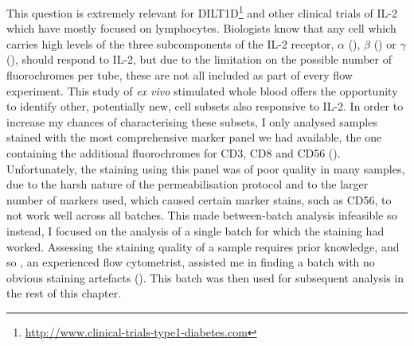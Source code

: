 This question is extremely relevant for DILT1D\footnote{\url{http://www.clinical-trials-type1-diabetes.com}} and other clinical trials of IL-2 which have mostly focused on lymphocytes.  %
Biologists know that any cell which carries high levels of the three subcomponents of the IL-2 receptor, $\alpha$ (), $\beta$ () or $\gamma$ (), should respond to IL-2, but due
to the limitation on the possible number of fluorochromes per tube, these are not all included as part of every flow experiment.  
This study of \emph{ex vivo} stimulated whole blood offers the opportunity to identify other, potentially new, cell subsets also responsive to IL-2.
In order to increase my chances of characterising these subsets, I only analysed samples stained with the most comprehensive marker panel we had available, the one containing the additional fluorochromes for CD3, CD8 and CD56 ().
Unfortunately, the staining using this panel was of poor quality in many samples, due to the harsh nature of the permeabilisation protocol and to the larger number of markers used, which caused certain marker stains, such as CD56, to not work well across all batches.
This made between-batch analysis infeasible so instead, I focused on the analysis of a single batch for which the staining had worked. %
Assessing the staining quality of a sample requires prior knowledge, and so , an experienced flow cytometrist, assisted me in finding a batch with no obvious staining artefacts ().
This batch was then used for subsequent analysis in the rest of this chapter.

